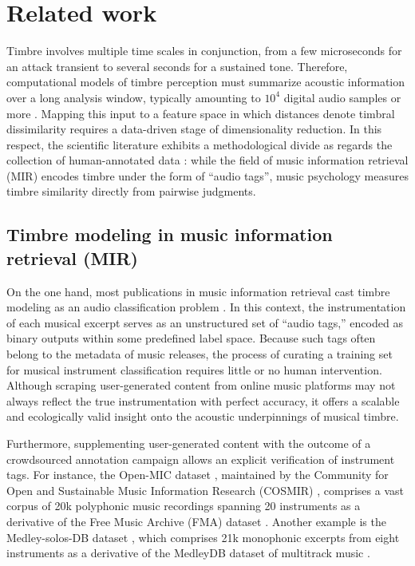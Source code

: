 \documentclass{bmcart}
\newcommand{\ja}[1]{\textcolor{purple}{JA: #1}\xspace}
\newcommand{\nmu}{}
\begin{document}
\section*{\nmu Related work}
\label{sec:related-work}

Timbre involves multiple time scales in conjunction, from a few microseconds for an attack transient to several seconds for a sustained tone.
Therefore, computational models of timbre perception must summarize acoustic information over a long analysis window, typically amounting to $10^{4}$ digital audio samples or more \cite{joder2009taslp}.
Mapping this input to a feature space in which distances denote timbral dissimilarity requires a data-driven stage of dimensionality reduction.
In this respect, the scientific literature exhibits a methodological divide as regards the collection of human-annotated data \cite{siedenburg2016jnmr}: while the field of music information retrieval (MIR) encodes timbre under the form of ``audio tags'', music psychology measures timbre similarity directly from pairwise judgments.

\subsection*{Timbre modeling in music information retrieval (MIR)}
On the one hand, most publications in music information retrieval cast timbre modeling as an audio classification problem  \cite{martin1998asa,brown1999jasa,eronen2000icassp,herrera2003jnmr,wieczorkowska2003jiis,livshin2004dafx,krishna2004icassp,kaminskyj2005jiis,benetos2006icassp,bhalke2016jiis}.
In this context, the instrumentation of each musical excerpt serves as an unstructured set of ``audio tags,'' encoded as binary outputs within some predefined label space.
Because such tags often belong to the metadata of music releases, the process of curating a training set for musical instrument classification requires little or no human intervention.
Although scraping user-generated content from online music platforms may not always reflect the true instrumentation with perfect accuracy, it offers a scalable and ecologically valid insight onto the acoustic underpinnings of musical timbre.

Furthermore, supplementing user-generated content with the outcome of a crowdsourced annotation campaign allows an explicit verification of instrument tags.
For instance, the Open-MIC dataset \cite{humphrey2018ismir}, maintained by the Community for Open and Sustainable Music Information Research (COSMIR) \cite{mcfee2016ismir}, comprises a vast corpus of 20k polyphonic music recordings spanning 20 instruments as a derivative of the Free Music Archive (FMA) dataset \cite{defferrard2017ismir}. %
Another example is the Medley-solos-DB dataset \cite{lostanlen2016ismir}, which comprises 21k monophonic excerpts from eight instruments as a derivative of the MedleyDB dataset of multitrack music \cite{bittner2014ismir}.
\end{document}
